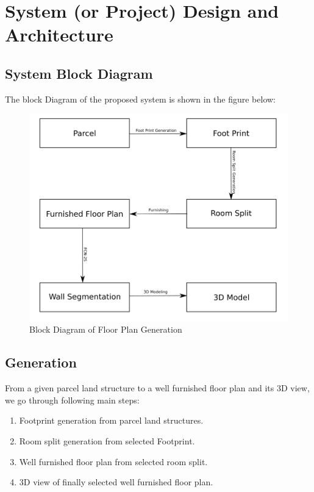 	\chapter{System (or Project) Design and Architecture}
        \section{System Block Diagram}
        The block Diagram of the proposed system is shown in the figure below: 
        \begin{figure}[h]
                \centering
                \includegraphics[width=1\textwidth]{img/chapter_6/Floor_plan_generation_block_diagram.png}
                \caption{Block Diagram of Floor Plan Generation}
                \label{fig: Block Diagram of Floor Plan Generation}
        \end{figure}
        \pagebreak 
        \section{Generation}
                From a given parcel land structure to a well furnished floor plan and its 3D view, we go through following main steps:
                \begin{enumerate}[label=\alph*.]
                        \item Footprint generation from parcel land structures.
                        \item Room split generation from selected Footprint.
                        \item Well furnished floor plan from selected room split.
                        \item 3D view of finally selected well furnished floor plan.
                \end{enumerate}
